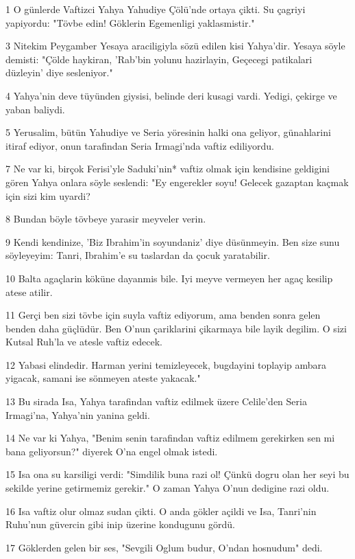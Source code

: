 \par 1 O günlerde Vaftizci Yahya Yahudiye Çölü'nde ortaya çikti. Su çagriyi yapiyordu: "Tövbe edin! Göklerin Egemenligi yaklasmistir."
\par 3 Nitekim Peygamber Yesaya araciligiyla sözü edilen kisi Yahya'dir. Yesaya söyle demisti: "Çölde haykiran, 'Rab'bin yolunu hazirlayin, Geçecegi patikalari düzleyin' diye sesleniyor."
\par 4 Yahya'nin deve tüyünden giysisi, belinde deri kusagi vardi. Yedigi, çekirge ve yaban baliydi.
\par 5 Yerusalim, bütün Yahudiye ve Seria yöresinin halki ona geliyor, günahlarini itiraf ediyor, onun tarafindan Seria Irmagi'nda vaftiz ediliyordu.
\par 7 Ne var ki, birçok Ferisi'yle Saduki'nin* vaftiz olmak için kendisine geldigini gören Yahya onlara söyle seslendi: "Ey engerekler soyu! Gelecek gazaptan kaçmak için sizi kim uyardi?
\par 8 Bundan böyle tövbeye yarasir meyveler verin.
\par 9 Kendi kendinize, 'Biz Ibrahim'in soyundaniz' diye düsünmeyin. Ben size sunu söyleyeyim: Tanri, Ibrahim'e su taslardan da çocuk yaratabilir.
\par 10 Balta agaçlarin köküne dayanmis bile. Iyi meyve vermeyen her agaç kesilip atese atilir.
\par 11 Gerçi ben sizi tövbe için suyla vaftiz ediyorum, ama benden sonra gelen benden daha güçlüdür. Ben O'nun çariklarini çikarmaya bile layik degilim. O sizi Kutsal Ruh'la ve atesle vaftiz edecek.
\par 12 Yabasi elindedir. Harman yerini temizleyecek, bugdayini toplayip ambara yigacak, samani ise sönmeyen ateste yakacak."
\par 13 Bu sirada Isa, Yahya tarafindan vaftiz edilmek üzere Celile'den Seria Irmagi'na, Yahya'nin yanina geldi.
\par 14 Ne var ki Yahya, "Benim senin tarafindan vaftiz edilmem gerekirken sen mi bana geliyorsun?" diyerek O'na engel olmak istedi.
\par 15 Isa ona su karsiligi verdi: "Simdilik buna razi ol! Çünkü dogru olan her seyi bu sekilde yerine getirmemiz gerekir." O zaman Yahya O'nun dedigine razi oldu.
\par 16 Isa vaftiz olur olmaz sudan çikti. O anda gökler açildi ve Isa, Tanri'nin Ruhu'nun güvercin gibi inip üzerine kondugunu gördü.
\par 17 Göklerden gelen bir ses, "Sevgili Oglum budur, O'ndan hosnudum" dedi.

